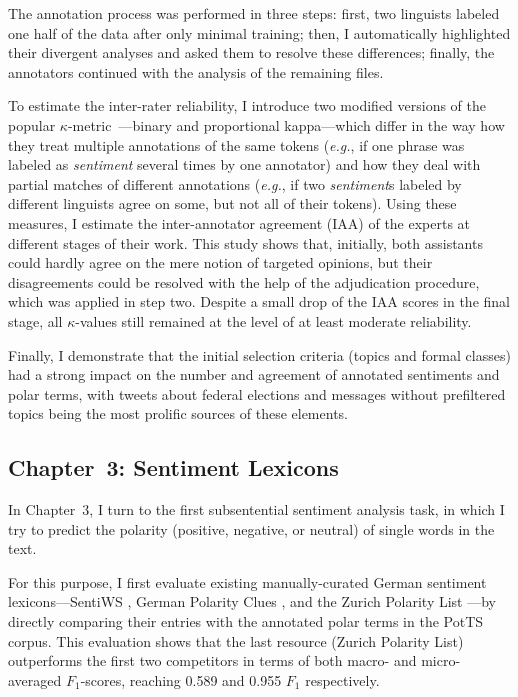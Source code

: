 \documentclass[11pt]{article}
\newcommand{\eg}{\textit{e.g.},}
\newcommand{\F}[0]{$F_1$}
\renewcommand{\cite}{\citep}
\begin{document}
The annotation process was performed in three steps: first, two
linguists labeled one half of the data after only minimal training;
then, I automatically highlighted their divergent analyses and asked
them to resolve these differences; finally, the annotators continued
with the analysis of the remaining files.

To estimate the inter-rater reliability, I introduce two modified
versions of the popular $\kappa$-metric~\cite{Cohen:60}---binary and
proportional kappa---which differ in the way how they treat multiple
annotations of the same tokens (\eg{} if one phrase was labeled as
\emph{sentiment} several times by one annotator) and how they deal
with partial matches of different annotations (\eg{} if two
\emph{sentiment}s labeled by different linguists agree on some, but
not all of their tokens).  Using these measures, I estimate the
inter-annotator agreement (IAA) of the experts at different stages of
their work.  This study shows that, initially, both assistants could
hardly agree on the mere notion of targeted opinions, but their
disagreements could be resolved with the help of the adjudication
procedure, which was applied in step two.  Despite a small drop of the
IAA scores in the final stage, all $\kappa$-values still remained at
the level of at least moderate reliability.

Finally, I demonstrate that the initial selection criteria (topics and
formal classes) had a strong impact on the number and agreement of
annotated sentiments and polar terms, with tweets about federal
elections and messages without prefiltered topics being the most
prolific sources of these elements.

\subsection{Chapter~3: Sentiment Lexicons}

In Chapter~3, I turn to the first subsentential sentiment analysis
task, in which I try to predict the polarity (positive, negative, or
neutral) of single words in the text.

For this purpose, I first evaluate existing manually-curated German
sentiment lexicons---SentiWS \cite{Remus:10}, German Polarity Clues
\cite{Waltinger:10}, and the Zurich Polarity List
\cite{Clematide:10}---by directly comparing their entries with the
annotated polar terms in the PotTS corpus.  This evaluation shows that
the last resource (Zurich Polarity List) outperforms the first two
competitors in terms of both macro- and micro-averaged \F{}-scores,
reaching 0.589 and 0.955 \F{} respectively.
\end{document}
